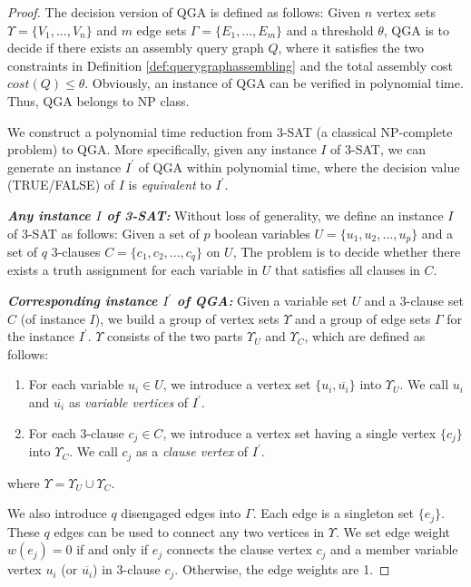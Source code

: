 \vspace{-0.1in}
\begin{proof}
	The decision version of QGA is defined as follows: 
	Given $n$ vertex sets $\Upsilon=\{V_1, ..., V_n\}$ and $m$ edge sets $\Gamma=\{E_1, ..., E_m\}$ and a threshold $\theta$, QGA is to decide if there exists an assembly query graph $Q$, where it satisfies the two constraints in Definition \ref{def:querygraphassembling} and the total assembly cost $cost(Q) \leq \theta$. Obviously, an instance of QGA can be verified in polynomial time. Thus, QGA belongs to NP class. 

	We construct a polynomial time reduction from 3-SAT (a classical NP-complete problem) to QGA. More specifically, given any instance $I$ of 3-SAT, we can generate an instance $I^{\prime}$ of QGA within polynomial time, where the decision value (TRUE/FALSE) of $I$ is \emph{equivalent} to $I^{\prime}$.
	
	\textbf{\emph{Any instance $I$ of 3-SAT:}}
	Without loss of generality, we define an instance $I$ of 3-SAT as follows: Given a set of $p$ boolean variables $U=\{u_1,u_2,...,u_p\}$ and a set of $q$ 3-clauses $C=\{c_1,c_2,...,c_q\}$ on $U$, The problem is to decide whether there exists a truth assignment for each variable in $U$ that satisfies all clauses in $C$.
	
	\textbf{\emph{Corresponding instance $I^{\prime}$ of QGA:}}
	Given a variable set $U$ and a 3-clause set $C$ (of instance $I$), we build a group of vertex sets $\Upsilon$ and a group of edge sets $\Gamma$ for the instance $I^{\prime}$.  $\Upsilon$ consists of the two parts $\Upsilon_{U}$ and $\Upsilon_{C}$, which are defined as follows:
	
	\begin{enumerate}
	\item For each variable $u_i \in U$, we introduce a vertex set $\{u_i,\overline{u_i}\}$ into $\Upsilon_{U}$. We call $u_i$ and $\overline{u_i}$ as \emph{variable vertices} of $I^{\prime}$. 
	\item For each 3-clause $c_j \in C$, we introduce a vertex set having a single vertex $\{c_j\}$ into $\Upsilon_{C}$. We call $c_j$ as a \emph{clause vertex} of $I^{\prime}$.  
	\end{enumerate}
	where $\Upsilon=\Upsilon_{U} \cup \Upsilon_{C}$.

	We also introduce $q$ disengaged edges into $\Gamma$. Each edge is a singleton set $\{e_j\}$. These $q$ edges can be used to connect any two vertices in $\Upsilon$. We set edge weight $w(e_j)=0$ if and only if $e_j$ connects the clause vertex $c_j$ and a member variable vertex $u_i$ (or $\overline{u_i}$) in 3-clause $c_j$. Otherwise, the edge weights are 1.
	

\end{proof}
